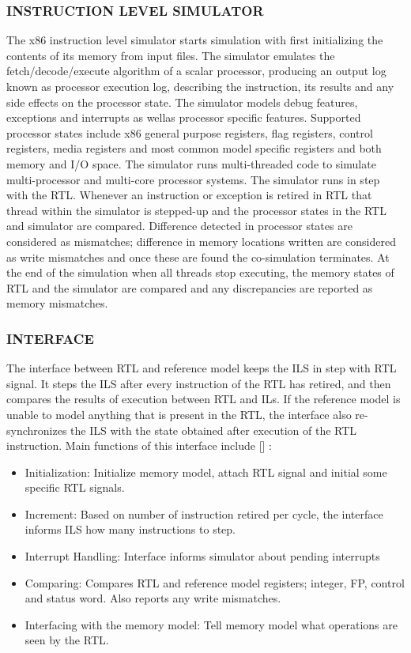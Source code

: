 \subsubsection {INSTRUCTION LEVEL SIMULATOR}
The x86 instruction level simulator starts simulation with first initializing the contents of its memory from input files. The simulator emulates the fetch/decode/execute algorithm of a scalar processor, producing an output log known as processor execution log, describing the instruction, its results and any side effects on the processor state. The simulator models debug features, exceptions and interrupts as wellas processor specific features. Supported processor states include x86 general purpose registers, flag registers, control registers, media registers and most common model specific registers and both memory and I/O space. The simulator runs multi-threaded code to simulate multi-processor and multi-core processor systems. 
The simulator runs in step with the RTL. Whenever an instruction or exception is retired in RTL that thread within the simulator is stepped-up and the processor states in the RTL and simulator are compared. Difference detected in processor states are considered as mismatches; difference in memory locations written are considered as write mismatches and once these are found the co-simulation terminates. At the end of the simulation when all threads stop executing, the memory states of RTL and the simulator are compared and any discrepancies are reported as memory mismatches.

\subsubsection {INTERFACE}
The interface between RTL and reference model keeps the ILS in step with RTL signal. It steps the ILS after every instruction of the RTL has retired, and then compares the results of execution between RTL and ILs. If the reference model is unable to model anything that is present in the RTL, the interface also re-synchronizes the ILS with the state obtained after execution of the RTL instruction.
Main functions of this interface include [] :
\begin{itemize}
	\item Initialization: Initialize memory model, attach RTL signal and initial some specific RTL signals.
	\item Increment: Based on number of instruction retired per cycle, the interface informs ILS how many instructions to step.
	\item Interrupt Handling: Interface informs simulator about pending interrupts
	\item Comparing: Compares RTL and reference model registers; integer, FP, control and status word. Also reports any write mismatches. 
	\item Interfacing with the memory model: Tell memory model what operations are seen by the RTL. 
\end{itemize}


